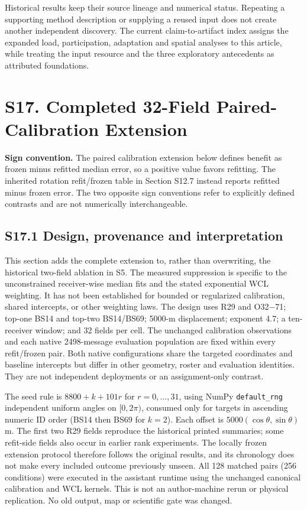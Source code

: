 \documentclass[journal,onecolumn,10pt]{IEEEtran}
\begin{document}
Historical results keep their source lineage and numerical status. Repeating a supporting method description or supplying a reused input does not create another independent discovery. The current claim-to-artifact index assigns the expanded load, participation, adaptation and spatial analyses to this article, while treating the input resource and the three exploratory antecedents as attributed foundations.


\clearpage
\section*{S17. Completed 32-Field Paired-Calibration Extension}
\par\noindent\textbf{Sign convention.} The paired calibration extension below defines benefit as frozen minus refitted median error, so a positive value favors refitting. The inherited rotation refit/frozen table in Section S12.7 instead reports refitted minus frozen error. The two opposite sign conventions refer to explicitly defined contrasts and are not numerically interchangeable.\par

\subsection*{S17.1 Design, provenance and interpretation}
This section adds the complete extension to, rather than overwriting, the historical two-field ablation in S5. The measured suppression is specific to the unconstrained receiver-wise median fits and the stated exponential WCL weighting. It has not been established for bounded or regularized calibration, shared intercepts, or other weighting laws. The design uses R29 and O32$-$71; top-one BS14 and top-two BS14/BS69; 5000-m displacement; exponent 4.7; a ten-receiver window; and 32 fields per cell. The unchanged calibration observations and each native 2498-message evaluation population are fixed within every refit/frozen pair. Both native configurations share the targeted coordinates and baseline intercepts but differ in other geometry, roster and evaluation identities. They are not independent deployments or an assignment-only contrast.

The seed rule is $8800+k+101r$ for $r=0,\ldots,31$, using NumPy \texttt{default\_rng} independent uniform angles on $[0,2\pi)$, consumed only for targets in ascending numeric ID order (BS14 then BS69 for $k=2$). Each offset is $5000(\cos\theta,\sin\theta)$ m. The first two R29 fields reproduce the historical printed summaries; some refit-side fields also occur in earlier rank experiments. The locally frozen extension protocol therefore follows the original results, and its chronology does not make every included outcome previously unseen. All 128 matched pairs (256 conditions) were executed in the assistant runtime using the unchanged canonical calibration and WCL kernels. This is not an author-machine rerun or physical replication. No old output, map or scientific gate was changed.
\end{document}
